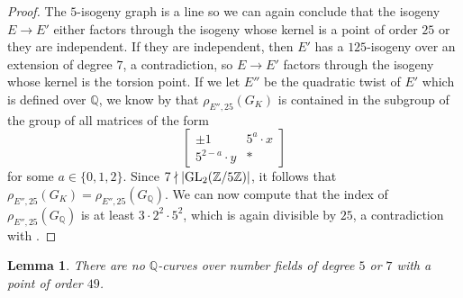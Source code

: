 \documentclass[10pt,leqno]{amsart}
\newcommand\m[1]{\begin{bmatrix}#1\end{bmatrix}}
\newcommand{\Z}{\mathbb{Z}}
\newcommand{\Q}{\mathbb{Q}}
\newcommand{\GL}{\textnormal{GL}}
\newtheorem{lemma}[theorem]{Lemma}
\theoremstyle{definition}
\theoremstyle{remark}
\numberwithin{theorem}{section}
\begin{document}
\begin{proof}
The $5$-isogeny graph is a line so we can again conclude that the isogeny $E \to E'$ either factors through the isogeny whose kernel is a point of order $25$ or they are independent. If they are independent, then $E'$ has a $125$-isogeny over an extension of degree $7$, a contradiction, so $E \to E'$ factors through the isogeny whose kernel is the torsion point. If we let $E''$ be the quadratic twist of $E'$ which is defined over $\Q$, we know by  that $\rho_{E'', 25}(G_K)$ is contained in the subgroup of the group of all matrices of the form $$\m{\pm 1 & 5^a \cdot x \\
    5^{2-a}\cdot y & *}$$ for some $a \in \{0,1,2\}$. Since $7 \nmid |\GL_2(\Z/5\Z)|$, it follows that  $\rho_{E'', 25}(G_K)=\rho_{E'', 25}(G_\Q)$. We can now compute that the index of $\rho_{E'', 25}(G_\Q)$ is at least $3 \cdot 2^2 \cdot 5^2$, which is again divisible by $25$, a contradiction with .
\end{proof}

\begin{lemma}
    There are no $\Q$-curves over number fields of degree $5$ or $7$ with a point of order $49$.
\end{lemma}
\end{document}
